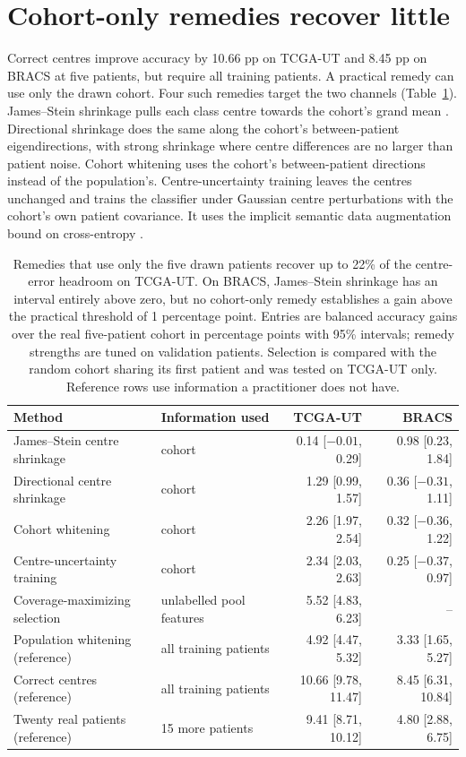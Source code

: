\documentclass[11pt]{article}
\begin{document}
\section{Cohort-only remedies recover little}
Correct centres improve accuracy by 10.66 pp on TCGA-UT and 8.45 pp on BRACS at five patients, but require all training patients. A practical remedy can use only the drawn cohort. Four such remedies target the two channels (Table~\ref{tab:remedies}). James--Stein shrinkage pulls each class centre towards the cohort's grand mean \citep{james1961}. Directional shrinkage does the same along the cohort's between-patient eigendirections, with strong shrinkage where centre differences are no larger than patient noise. Cohort whitening uses the cohort's between-patient directions instead of the population's. Centre-uncertainty training leaves the centres unchanged and trains the classifier under Gaussian centre perturbations with the cohort's own patient covariance. It uses the implicit semantic data augmentation bound on cross-entropy \citep{wang2019isda}.

\begin{table}[!htb]
\centering\small
\setlength{\tabcolsep}{5pt}
\begin{tabular}{@{}llrr@{}}
\toprule
Method & Information used & TCGA-UT & BRACS \\
\midrule
James--Stein centre shrinkage & cohort & 0.14 [$-0.01$, 0.29] & 0.98 [0.23, 1.84] \\
Directional centre shrinkage & cohort & 1.29 [0.99, 1.57] & 0.36 [$-0.31$, 1.11] \\
Cohort whitening & cohort & 2.26 [1.97, 2.54] & 0.32 [$-0.36$, 1.22] \\
Centre-uncertainty training & cohort & 2.34 [2.03, 2.63] & 0.25 [$-0.37$, 0.97] \\
\addlinespace
Coverage-maximizing selection & unlabelled pool features & 5.52 [4.83, 6.23] & -- \\
\addlinespace
Population whitening (reference) & all training patients & 4.92 [4.47, 5.32] & 3.33 [1.65, 5.27] \\
Correct centres (reference) & all training patients & 10.66 [9.78, 11.47] & 8.45 [6.31, 10.84] \\
Twenty real patients (reference) & 15 more patients & 9.41 [8.71, 10.12] & 4.80 [2.88, 6.75] \\
\bottomrule
\end{tabular}
\caption{Remedies that use only the five drawn patients recover up to 22\% of the centre-error headroom on TCGA-UT. On BRACS, James--Stein shrinkage has an interval entirely above zero, but no cohort-only remedy establishes a gain above the practical threshold of 1 percentage point. Entries are balanced accuracy gains over the real five-patient cohort in percentage points with 95\% intervals; remedy strengths are tuned on validation patients. Selection is compared with the random cohort sharing its first patient and was tested on TCGA-UT only. Reference rows use information a practitioner does not have.}
\label{tab:remedies}
\end{table}
\end{document}
